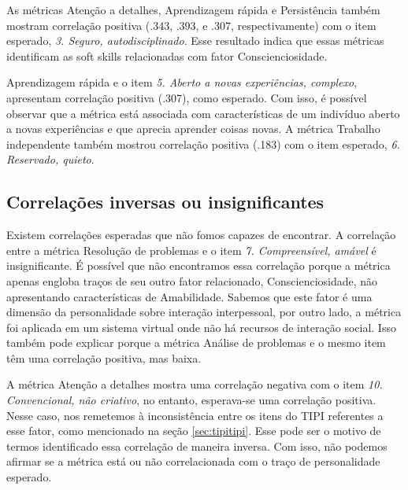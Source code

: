 As métricas Atenção a detalhes, Aprendizagem rápida e Persistência também mostram correlação positiva (.343, .393, e .307, respectivamente) com o item esperado, \textit{3. Seguro, autodisciplinado}. Esse resultado indica que essas métricas identificam as soft skills relacionadas com fator Conscienciosidade.

Aprendizagem rápida e o item \textit{5. Aberto a novas experiências, complexo}, apresentam correlação positiva (.307), como esperado. Com isso, é possível observar que a métrica está associada com características de um indivíduo aberto a novas experiências e que aprecia aprender coisas novas. A métrica Trabalho independente também mostrou correlação positiva (.183) com o item esperado, \textit{6. Reservado, quieto}.

\subsection{Correlações inversas ou insignificantes}

Existem correlações esperadas que não fomos capazes de encontrar. A correlação entre a métrica Resolução de problemas e o item \textit{7. Compreensível, amável} é insignificante. É possível que não encontramos essa correlação porque a métrica apenas engloba traços de seu outro fator relacionado, Conscienciosidade, não apresentando características de Amabilidade. Sabemos que este fator é uma dimensão da personalidade sobre interação interpessoal, por outro lado, a métrica foi aplicada em um sistema virtual onde não há recursos de interação social. Isso também pode explicar porque a métrica Análise de problemas e o mesmo item têm uma correlação positiva, mas baixa.

A métrica Atenção a detalhes mostra uma correlação negativa com o item
\textit{10. Convencional, não criativo}, no entanto, esperava-se uma correlação positiva.
Nesse caso, nos remetemos à inconsistência entre os itens do TIPI referentes a esse fator, como mencionado na seção \ref{sec:tipitipi}.
Esse pode ser o motivo de termos identificado essa correlação de maneira inversa.
Com isso, não podemos afirmar se a métrica está ou não correlacionada com o traço de personalidade esperado.

